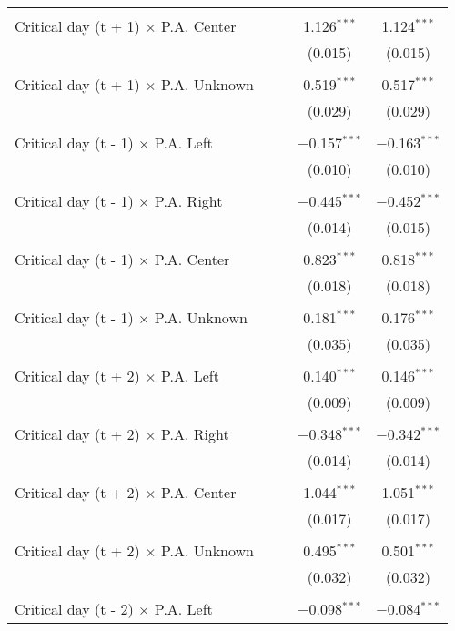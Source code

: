 \documentclass[
]{article}
\begin{document}
\begin{table}[!htbp]
{\begin{tabular}{@{\extracolsep{5pt}}lcccc}
  & & & & \\ 
 Critical day (t + 1) $\times$ P.A. Center &  &  & 1.126$^{***}$ & 1.124$^{***}$ \\ 
  &  &  & (0.015) & (0.015) \\ 
  & & & & \\ 
 Critical day (t + 1) $\times$ P.A. Unknown &  &  & 0.519$^{***}$ & 0.517$^{***}$ \\ 
  &  &  & (0.029) & (0.029) \\ 
  & & & & \\ 
 Critical day (t - 1) $\times$ P.A. Left &  &  & $-$0.157$^{***}$ & $-$0.163$^{***}$ \\ 
  &  &  & (0.010) & (0.010) \\ 
  & & & & \\ 
 Critical day (t - 1) $\times$ P.A. Right &  &  & $-$0.445$^{***}$ & $-$0.452$^{***}$ \\ 
  &  &  & (0.014) & (0.015) \\ 
  & & & & \\ 
 Critical day (t - 1) $\times$ P.A. Center &  &  & 0.823$^{***}$ & 0.818$^{***}$ \\ 
  &  &  & (0.018) & (0.018) \\ 
  & & & & \\ 
 Critical day (t - 1) $\times$ P.A. Unknown &  &  & 0.181$^{***}$ & 0.176$^{***}$ \\ 
  &  &  & (0.035) & (0.035) \\ 
  & & & & \\ 
 Critical day (t + 2) $\times$ P.A. Left &  &  & 0.140$^{***}$ & 0.146$^{***}$ \\ 
  &  &  & (0.009) & (0.009) \\ 
  & & & & \\ 
 Critical day (t + 2) $\times$ P.A. Right &  &  & $-$0.348$^{***}$ & $-$0.342$^{***}$ \\ 
  &  &  & (0.014) & (0.014) \\ 
  & & & & \\ 
 Critical day (t + 2) $\times$ P.A. Center &  &  & 1.044$^{***}$ & 1.051$^{***}$ \\ 
  &  &  & (0.017) & (0.017) \\ 
  & & & & \\ 
 Critical day (t + 2) $\times$ P.A. Unknown &  &  & 0.495$^{***}$ & 0.501$^{***}$ \\ 
  &  &  & (0.032) & (0.032) \\ 
  & & & & \\ 
 Critical day (t - 2) $\times$ P.A. Left &  &  & $-$0.098$^{***}$ & $-$0.084$^{***}$ \\ 

\end{tabular}}
\end{table}
\end{document}
